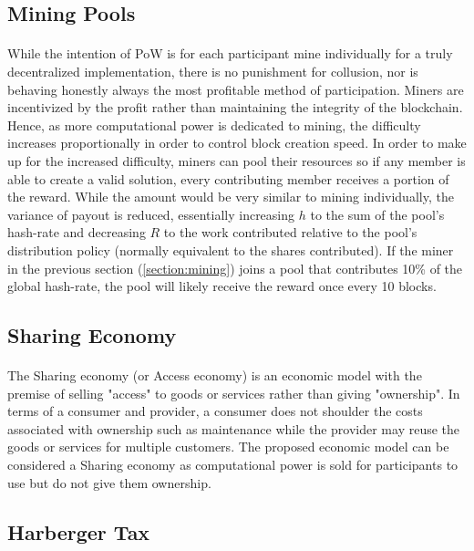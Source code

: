 \subsection{Mining Pools}

\paragraph{} While the intention of PoW is for each participant mine individually for a truly decentralized implementation, there is no punishment for collusion, nor is behaving honestly always the most profitable method of participation. Miners are incentivized by the profit rather than maintaining the integrity of the blockchain. Hence, as  more computational power is dedicated to mining, the difficulty increases proportionally in order to control block creation speed. In order to make up for the increased difficulty, miners can pool their resources so if any member is able to create a valid solution, every contributing member receives a portion of the reward. While the amount would be very similar to mining individually, the variance of payout is reduced, essentially increasing $h$ to the sum of the pool's hash-rate and decreasing $R$ to the work contributed relative to the pool's distribution policy (normally equivalent to the shares contributed). If the miner in the previous section (\ref{section:mining}) joins a pool that contributes 10\% of the global hash-rate, the pool will likely receive the reward once every 10 blocks.

\subsection{Sharing Economy} \label{section:sharingeconomy}

\paragraph{} The Sharing economy (or Access economy) is an economic model with the premise of selling "access" to goods or services rather than giving "ownership". In terms of a consumer and provider, a consumer does not shoulder the costs associated with ownership such as maintenance while the provider may reuse the goods or services for multiple customers. The proposed economic model can be considered a Sharing economy as computational power is sold for participants to use but do not give them ownership.

\subsection{Harberger Tax} \label{section:harbergerstax}

